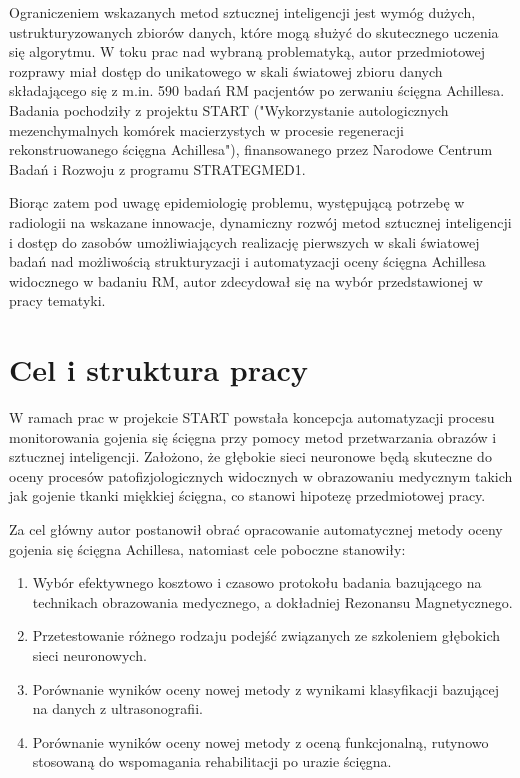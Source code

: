 Ograniczeniem wskazanych metod sztucznej inteligencji jest wymóg dużych, \linebreak ustrukturyzowanych zbiorów danych, które mogą służyć do skutecznego uczenia się algorytmu. W toku prac nad wybraną problematyką, autor przedmiotowej rozprawy miał dostęp do unikatowego w skali światowej zbioru danych składającego się \linebreak z m.in. 590 badań RM pacjentów po zerwaniu ścięgna Achillesa. Badania pochodziły z projektu START ("Wykorzystanie autologicznych mezenchymalnych komórek macierzystych w procesie regeneracji rekonstruowanego ścięgna Achillesa"), finansowanego przez Narodowe Centrum Badań i Rozwoju z programu STRATEGMED1.

Biorąc zatem pod uwagę epidemiologię problemu, występującą potrzebę w radiologii na wskazane innowacje, dynamiczny rozwój metod sztucznej inteligencji \linebreak i dostęp do zasobów umożliwiających realizację pierwszych w skali światowej badań nad możliwością strukturyzacji i automatyzacji oceny ścięgna Achillesa widocznego w badaniu RM, autor zdecydował się na wybór przedstawionej w pracy tematyki.  
 

{\let\clearpage\relax\chapter*{Cel i struktura pracy}}

W ramach prac w projekcie START powstała koncepcja automatyzacji procesu monitorowania gojenia się ścięgna przy pomocy metod przetwarzania obrazów \linebreak i sztucznej inteligencji. Założono, że głębokie sieci neuronowe będą skuteczne do oceny procesów patofizjologicznych widocznych w obrazowaniu medycznym takich jak gojenie tkanki miękkiej ścięgna, co stanowi hipotezę przedmiotowej pracy.

Za cel główny autor postanowił obrać opracowanie automatycznej metody oceny gojenia się ścięgna Achillesa, natomiast cele poboczne stanowiły:
\begin{enumerate}
	\item Wybór efektywnego kosztowo i czasowo protokołu badania bazującego na technikach obrazowania medycznego, a dokładniej Rezonansu Magnetycznego.
	\item Przetestowanie różnego rodzaju podejść związanych ze szkoleniem głębokich sieci neuronowych.
	\item Porównanie wyników oceny nowej metody z wynikami klasyfikacji bazującej na danych z ultrasonografii.
	\item Porównanie wyników oceny nowej metody z oceną funkcjonalną, rutynowo stosowaną do wspomagania rehabilitacji po urazie ścięgna.
\end{enumerate}

